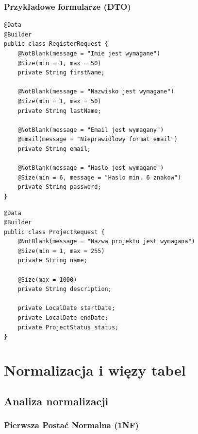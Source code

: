 \documentclass[12pt,a4paper]{report}
\begin{document}
\subsection{Przykładowe formularze (DTO)}

\begin{lstlisting}[style=javastyle, caption={RegisterRequest - formularz rejestracji}]
@Data
@Builder
public class RegisterRequest {
    @NotBlank(message = "Imie jest wymagane")
    @Size(min = 1, max = 50)
    private String firstName;
    
    @NotBlank(message = "Nazwisko jest wymagane")
    @Size(min = 1, max = 50)
    private String lastName;
    
    @NotBlank(message = "Email jest wymagany")
    @Email(message = "Nieprawidlowy format email")
    private String email;
    
    @NotBlank(message = "Haslo jest wymagane")
    @Size(min = 6, message = "Haslo min. 6 znakow")
    private String password;
}
\end{lstlisting}

\begin{lstlisting}[style=javastyle, caption={ProjectRequest - formularz projektu}]
@Data
@Builder
public class ProjectRequest {
    @NotBlank(message = "Nazwa projektu jest wymagana")
    @Size(min = 1, max = 255)
    private String name;
    
    @Size(max = 1000)
    private String description;
    
    private LocalDate startDate;
    private LocalDate endDate;
    private ProjectStatus status;
}
\end{lstlisting}

\chapter{Normalizacja i więzy tabel}

\section{Analiza normalizacji}

\subsection{Pierwsza Postać Normalna (1NF)}
\end{document}
